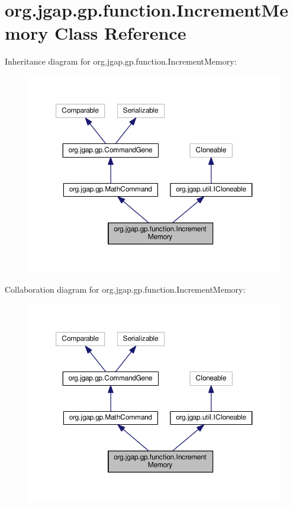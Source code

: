 \hypertarget{classorg_1_1jgap_1_1gp_1_1function_1_1_increment_memory}{\section{org.\-jgap.\-gp.\-function.\-Increment\-Memory Class Reference}
\label{classorg_1_1jgap_1_1gp_1_1function_1_1_increment_memory}
}


Inheritance diagram for org.\-jgap.\-gp.\-function.\-Increment\-Memory\-:
\nopagebreak
\begin{figure}[H]
\begin{center}
\leavevmode
\includegraphics[width=350pt]{classorg_1_1jgap_1_1gp_1_1function_1_1_increment_memory__inherit__graph}
\end{center}
\end{figure}


Collaboration diagram for org.\-jgap.\-gp.\-function.\-Increment\-Memory\-:
\nopagebreak
\begin{figure}[H]
\begin{center}
\leavevmode
\includegraphics[width=350pt]{classorg_1_1jgap_1_1gp_1_1function_1_1_increment_memory__coll__graph}
\end{center}
\end{figure}
